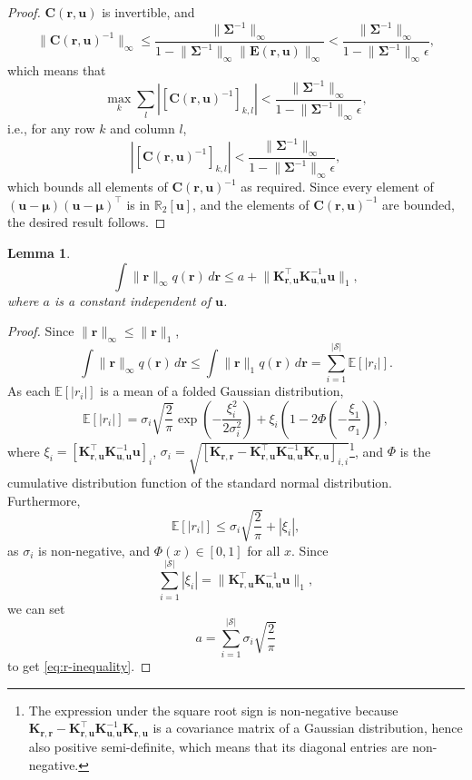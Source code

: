 \documentclass{article}
\newtheorem{lemma}[theorem]{Lemma}
\theoremstyle{definition}
\theoremstyle{remark}
\newcommand{\Kuu}{\mathbf{K}_{\mathbf{u},\mathbf{u}}}
\newcommand{\Krr}{\mathbf{K}_{\mathbf{r},\mathbf{r}}}
\newcommand{\Kru}{\mathbf{K}_{\mathbf{r},\mathbf{u}}}
\newcommand{\rinf}{\lVert \mathbf{r} \rVert_\infty}
\begin{document}
\begin{proof}
  $\mathbf{C}(\mathbf{r}, \mathbf{u})$ is invertible, and
  \[
    \lVert \mathbf{C}(\mathbf{r}, \mathbf{u})^{-1} \rVert_\infty \le
    \frac{\lVert \bm\Sigma^{-1} \rVert_\infty}{1 - \lVert \bm\Sigma^{-1}
      \rVert_\infty \lVert \mathbf{E}(\mathbf{r}, \mathbf{u}) \rVert_\infty} <
    \frac{\lVert \bm\Sigma^{-1} \rVert_\infty}{1 - \lVert \bm\Sigma^{-1}
      \rVert_\infty \epsilon},
  \]
  which means that
  \[
    \max_k \sum_l \left| [\mathbf{C}(\mathbf{r}, \mathbf{u})^{-1}]_{k,l} \right|
    < \frac{\lVert \bm\Sigma^{-1} \rVert_\infty}{1 - \lVert \bm\Sigma^{-1}
      \rVert_\infty \epsilon},
  \]
  i.e., for any row $k$ and column $l$,
  \[
    \left| [\mathbf{C}(\mathbf{r}, \mathbf{u})^{-1}]_{k,l} \right| <
    \frac{\lVert \bm\Sigma^{-1} \rVert_\infty}{1 - \lVert \bm\Sigma^{-1}
      \rVert_\infty \epsilon},
  \]
  which bounds all elements of $\mathbf{C}(\mathbf{r}, \mathbf{u})^{-1}$ as
  required. Since every element of $(\mathbf{u} - \bm\mu)(\mathbf{u} -
  \bm\mu)^\intercal$ is in $\mathbb{R}_2[\mathbf{u}]$, and the elements of
  $\mathbf{C}(\mathbf{r}, \mathbf{u})^{-1}$ are bounded, the desired result
  follows.
\end{proof}

\begin{lemma} \label{lemma:integral_of_r}
  \begin{equation} \label{eq:r-inequality}
    \int \lVert \mathbf{r} \rVert_\infty q(\mathbf{r})\,d\mathbf{r} \le a +
    \lVert \Kru^\intercal \Kuu^{-1} \mathbf{u} \rVert_1,
  \end{equation}
  where $a$ is a constant independent of $\mathbf{u}$.
\end{lemma}
\begin{proof}
  Since $\rinf \le \lVert \mathbf{r} \rVert_1$,
  \[
    \int \lVert \mathbf{r} \rVert_\infty q(\mathbf{r})\,d\mathbf{r} \le \int
    \lVert \mathbf{r} \rVert_1 q(\mathbf{r})\,d\mathbf{r} =
    \sum_{i=1}^{|\mathcal{S}|} \mathbb{E}[|r_i|].
  \]
  As each $\mathbb{E}[|r_i|]$ is a mean of a folded Gaussian distribution,
  \[
    \mathbb{E}[|r_i|] = \sigma_i \sqrt{\frac{2}{\pi}} \exp
    \left(-\frac{\xi_i^2}{2\sigma_i^2} \right) + \xi_i \left( 1 - 2\Phi \left(
        -\frac{\xi_1}{\sigma_1} \right) \right),
  \]
  where $\xi_i = \left[\Kru^\intercal\Kuu^{-1}\mathbf{u}\right]_i$, $\sigma_i =
  \sqrt{[\Krr - \Kru^\intercal\Kuu^{-1}\Kru]_{i,i}}$\footnote{The expression
    under the square root sign is non-negative because $\Krr -
    \Kru^\intercal\Kuu^{-1}\Kru$ is a covariance matrix of a Gaussian
    distribution, hence also positive semi-definite, which means that its
    diagonal entries are non-negative.}, and $\Phi$ is the cumulative
  distribution function of the standard normal distribution. Furthermore,
  \[
    \mathbb{E}[|r_i|] \le \sigma_i\sqrt{\frac{2}{\pi}} + |\xi_i|,
  \]
  as $\sigma_i$ is non-negative, and $\Phi(x) \in [0, 1]$ for all $x$. Since
  \[ \sum_{i=1}^{|\mathcal{S}|} |\xi_i| = \lVert \Kru^\intercal \Kuu^{-1}
    \mathbf{u} \rVert_1, \]
  we can set
  \[ a = \sum_{i=1}^{|\mathcal{S}|} \sigma_i \sqrt{\frac{2}{\pi}} \]
  to get \eqref{eq:r-inequality}.
\end{proof}
\end{document}
